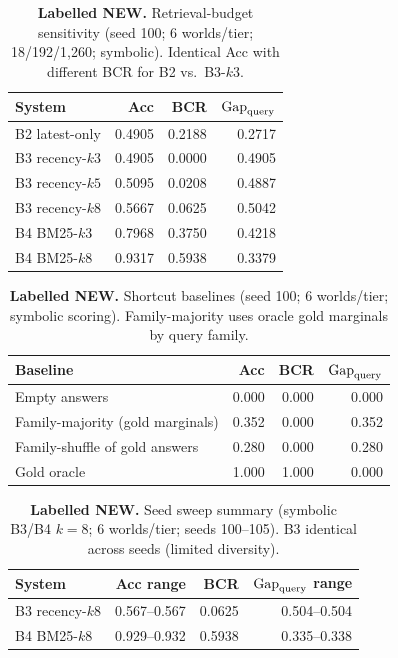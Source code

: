 \begin{table}[t]
\centering
\caption{\textbf{Labelled NEW.} Retrieval-budget sensitivity (seed 100; 6 worlds/tier; 18/192/1{,}260; symbolic). Identical Acc with different BCR for B2 vs.\ B3-$k3$.}
\label{tab:budget}
\small
\begin{tabular}{lrrr}
\toprule
System & Acc & BCR & $\mathrm{Gap}_{\mathrm{query}}$ \\
\midrule
B2 latest-only & 0.4905 & 0.2188 & 0.2717 \\
B3 recency-$k3$ & 0.4905 & 0.0000 & 0.4905 \\
B3 recency-$k5$ & 0.5095 & 0.0208 & 0.4887 \\
B3 recency-$k8$ & 0.5667 & 0.0625 & 0.5042 \\
B4 BM25-$k3$ & 0.7968 & 0.3750 & 0.4218 \\
B4 BM25-$k8$ & 0.9317 & 0.5938 & 0.3379 \\
\bottomrule
\end{tabular}
\end{table}

\begin{table}[t]
\centering
\caption{\textbf{Labelled NEW.} Shortcut baselines (seed 100; 6 worlds/tier; symbolic scoring). Family-majority uses oracle gold marginals by query family.}
\label{tab:shortcuts}
\small
\begin{tabular}{lrrr}
\toprule
Baseline & Acc & BCR & $\mathrm{Gap}_{\mathrm{query}}$ \\
\midrule
Empty answers & 0.000 & 0.000 & 0.000 \\
Family-majority (gold marginals) & 0.352 & 0.000 & 0.352 \\
Family-shuffle of gold answers & 0.280 & 0.000 & 0.280 \\
Gold oracle & 1.000 & 1.000 & 0.000 \\
\bottomrule
\end{tabular}
\end{table}

\begin{table}[t]
\centering
\caption{\textbf{Labelled NEW.} Seed sweep summary (symbolic B3/B4 $k{=}8$; 6 worlds/tier; seeds 100--105). B3 identical across seeds (limited diversity).}
\label{tab:seeds}
\small
\begin{tabular}{lrrr}
\toprule
System & Acc range & BCR & $\mathrm{Gap}_{\mathrm{query}}$ range \\
\midrule
B3 recency-$k8$ & 0.567--0.567 & 0.0625 & 0.504--0.504 \\
B4 BM25-$k8$ & 0.929--0.932 & 0.5938 & 0.335--0.338 \\
\bottomrule
\end{tabular}
\end{table}

